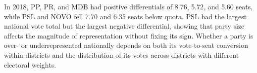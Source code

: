 \documentclass[11pt]{article}
\begin{document}

In 2018, PP, PR, and MDB had positive differentials of 8.76, 5.72, and
5.60 seats, while PSL and NOVO fell 7.70 and 6.35 seats below quota. PSL had
the largest national vote total but the largest negative differential, showing
that party size affects the magnitude of representation without fixing its
sign. Whether a party is over- or underrepresented nationally depends on both
its vote-to-seat conversion within districts and the distribution of its votes
across districts with different electoral weights.

\end{document}
